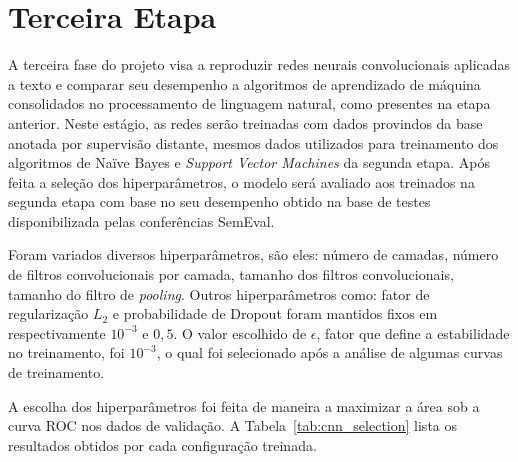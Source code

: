 \section{Terceira Etapa}

A terceira fase do projeto visa a reproduzir redes neurais convolucionais aplicadas a texto e comparar seu desempenho
a algoritmos de aprendizado de máquina consolidados no processamento de linguagem natural, como presentes na etapa
anterior.
Neste estágio, as redes serão treinadas com dados provindos da base anotada por supervisão distante, mesmos dados
utilizados para treinamento dos algoritmos de Naïve Bayes e \textit{Support Vector Machines} da segunda etapa.
Após feita a seleção dos hiperparâmetros, o modelo será avaliado aos treinados na segunda etapa com base no seu
desempenho obtido na base de testes disponibilizada pelas conferências SemEval.

Foram variados diversos hiperparâmetros, são eles: número de camadas, número de filtros convolucionais por camada,
tamanho dos filtros convolucionais, tamanho do filtro de \textit{pooling}.
Outros hiperparâmetros como: fator de regularização $L_{2}$ e probabilidade de Dropout foram mantidos fixos em
respectivamente $10^{-3}$ e $0,5$.
O valor escolhido de $\epsilon$, fator que define a estabilidade no treinamento, foi $10^{-3}$, o qual foi selecionado
após a análise de algumas curvas de treinamento.

A escolha dos hiperparâmetros foi feita de maneira a maximizar a área sob a curva ROC nos dados de validação.
A Tabela~\ref{tab:cnn_selection} lista os resultados obtidos por cada configuração treinada.

